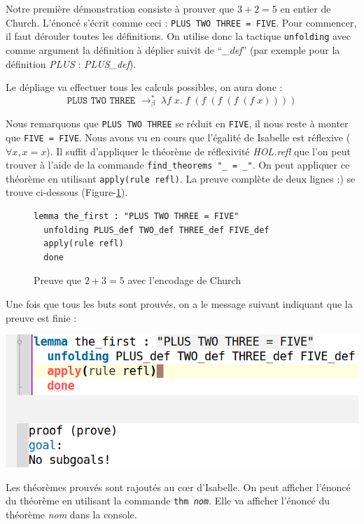 \documentclass{article}
\theoremstyle{plain}
\begin{document}
  Notre première démonstration consiste à prouver que $3 + 2 = 5$ en entier
  de Church. L'énoncé s'écrit comme ceci : \texttt{PLUS TWO THREE = FIVE}.
  Pour commencer, il faut dérouler toutes les définitions.
  On utilise donc la tactique \texttt{unfolding} avec comme argument la
  définition à déplier suivit de ``\textit{\_def}'' (par exemple pour la
  définition \textit{PLUS} : \textit{PLUS\_def}).

  Le dépliage va effectuer tous les calculs possibles, on aura donc :
  $$
  \texttt{PLUS TWO THREE }\to^*_\beta\;\lambda f\; x.\;f\;(f\;(f\;(f\;(f\;x))))
  $$

  Nous remarquons que \texttt{PLUS TWO THREE} se réduit en \texttt{FIVE}, il
  nous reste à monter que \texttt{FIVE = FIVE}.
  Nous avons vu en cours que l'égalité de Isabelle est réflexive
  ($\forall x, x = x$). Il suffit d'appliquer le théorème de réflexivité
  \textit{HOL.refl} que l'on peut trouver à l'aide de la commande
  \texttt{find\_theorems "\_ = \_"}. On peut appliquer ce théorème en utilisant
  \texttt{apply(rule refl)}. La preuve complète de deux lignes :) se trouve
  ci-dessous (Figure-\ref{fig:preuve}).

    \begin{figure}[htb]
    \begin{lstlisting}
lemma the_first : "PLUS TWO THREE = FIVE"
  unfolding PLUS_def TWO_def THREE_def FIVE_def
  apply(rule refl)
  done
    \end{lstlisting}
    \caption{Preuve que $2 + 3 = 5$ avec l'encodage de Church}
    \label{fig:preuve}
    \end{figure}

    Une fois que tous les buts sont prouvés, on a le message suivant indiquant
    que la preuve est finie :
    \begin{center}
      \includegraphics[scale=0.3]{fin_preuve.png}
    \end{center}

    Les théorèmes prouvés sont rajoutés au c\oe{}r d'Isabelle. On peut afficher
    l'énoncé du théorème en utilisant la commande \texttt{thm \textit{nom}}.
    Elle va afficher l'énoncé du théorème \textit{nom} dans la console.
\end{document}
